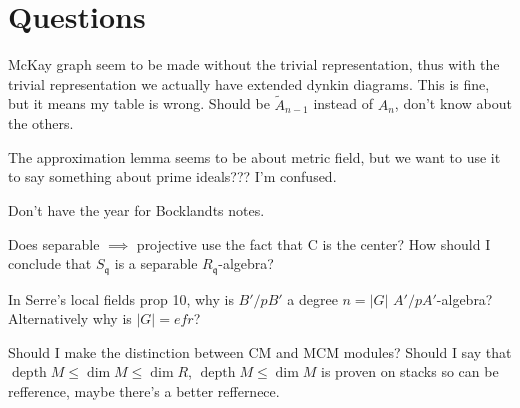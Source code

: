 \documentclass[11pt, a4paper, english]{article}
\theoremstyle{definition}
\DeclareMathOperator{\depth}{depth}
\begin{document}



\section*{Questions}
McKay graph seem to be made without the trivial representation, thus with the trivial representation we actually have extended dynkin diagrams. This is fine, but it means my table is wrong. Should be $\tilde{A}_{n-1}$ instead of $A_n$, don't know about the others.

The approximation lemma seems to be about metric field, but we want to use it to say something about prime ideals??? I'm confused.

Don't have the year for Bocklandts notes.

Does separable $\implies$ projective use the fact that C is the center? How should I conclude that $S_\mathfrak{q}$ is a separable $R_\mathfrak{q}$-algebra?

In Serre's local fields prop 10, why is $B'/pB'$ a degree $n = |G|$ $A'/pA'$-algebra? Alternatively why is $|G|=efr$?

Should I make the distinction between CM and MCM modules? Should I say that $\depth M \leq \dim M \leq \dim R$, $\depth M \leq \dim M$ is proven on stacks so can be refference, maybe there's a better reffernece.
\end{document}
